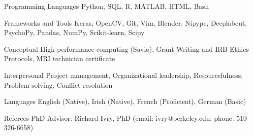

\begin{cvskills}

 \cvskill
  	{Programming Languages}
    {Python, SQL, R, MATLAB, HTML, Bash} %
  
 \cvskill
   {Frameworks and Tools}
   {Keras, OpenCV, Git, Vim, Blender, Nipype, Deeplabcut, PsychoPy, Pandas, NumPy, Scikit-learn, Scipy}
   
 \cvskill
   {Conceptual}
   {High performance computing (Savio), Grant Writing and IRB Ethics Protocols, MRI technician certificate}
  
 \cvskill
   {Interpersonal}
   {Project management, Organizational leadership, Resourcefulness, Problem solving, Conflict resolution}
   
  \cvskill
   {Languages}
   {English (Native), Irish (Native), French (Proficient), German (Basic)}
   
   
\cvskill
	{Referees}
	{PhD Advisor: Richard Ivry, PhD (email: ivry@berkeley.edu; phone: 510-326-6658)}
    

\end{cvskills}
